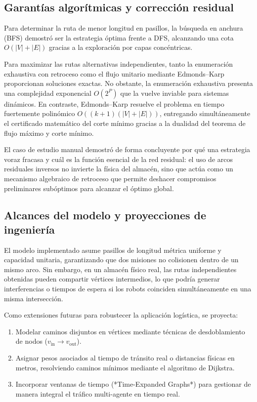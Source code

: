 \documentclass[11pt,a4paper]{article}
\newcommand{\tema}[1]{\subsection*{\color{verde}#1}}
\begin{document}
\tema{Garantías algorítmicas y corrección residual}
Para determinar la ruta de menor longitud en pasillos, la búsqueda en anchura (BFS) demostró ser la estrategia óptima frente a DFS, alcanzando una cota $O(|V| + |E|)$ gracias a la exploración por capas concéntricas.

Para maximizar las rutas alternativas independientes, tanto la enumeración exhaustiva con retroceso como el flujo unitario mediante Edmonds–Karp proporcionan soluciones exactas. No obstante, la enumeración exhaustiva presenta una complejidad exponencial $O(2^P)$ que la vuelve inviable para sistemas dinámicos. En contraste, Edmonds–Karp resuelve el problema en tiempo fuertemente polinómico $O((k+1)(|V| + |E|))$, entregando simultáneamente el certificado matemático del corte mínimo gracias a la dualidad del teorema de flujo máximo y corte mínimo.

El caso de estudio manual demostró de forma concluyente por qué una estrategia voraz fracasa y cuál es la función esencial de la red residual: el uso de arcos residuales inversos no invierte la física del almacén, sino que actúa como un mecanismo algebraico de retroceso que permite deshacer compromisos preliminares subóptimos para alcanzar el óptimo global.

\tema{Alcances del modelo y proyecciones de ingeniería}
El modelo implementado asume pasillos de longitud métrica uniforme y capacidad unitaria, garantizando que dos misiones no colisionen dentro de un mismo arco. Sin embargo, en un almacén físico real, las rutas independientes obtenidas pueden compartir vértices intermedios, lo que podría generar interferencias o tiempos de espera si los robots coinciden simultáneamente en una misma intersección.

Como extensiones futuras para robustecer la aplicación logística, se proyecta:
\begin{enumerate}
  \item Modelar caminos disjuntos en vértices mediante técnicas de desdoblamiento de nodos ($v_{\text{in}} \to v_{\text{out}}$).
  \item Asignar pesos asociados al tiempo de tránsito real o distancias físicas en metros, resolviendo caminos mínimos mediante el algoritmo de Dijkstra.
  \item Incorporar ventanas de tiempo (*Time-Expanded Graphs*) para gestionar de manera integral el tráfico multi-agente en tiempo real.
\end{enumerate}

\clearpage
\end{document}
